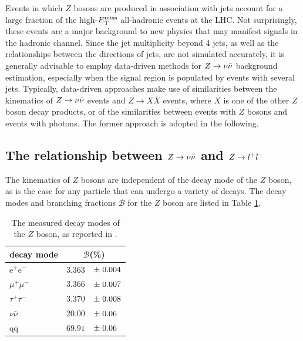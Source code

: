 Events in which $Z$ bosons are produced in association with jets account for a large fraction of the high-$E_{\text{T}}^{\rm miss}$ all-hadronic events at the LHC. Not surprisingly, these events are a major background to new physics that may manifest signals in the hadronic channel. Since the jet multiplicity beyond 4 jets, as well as the relationships between the directions of jets, are not simulated accurately, it is generally advisable to employ data-driven methods for $Z\rightarrow \nu\bar{\nu}$ background estimation, especially when the signal region is populated by events with several jets. Typically, data-driven approaches make use of similarities between the kinematics of $Z\rightarrow \nu\bar{\nu}$ events and $Z\rightarrow X\bar{X}$ events, where $X$ is one of the other $Z$ boson decay products, or of the similarities between events with $Z$ bosons and events with photons. The former approach is adopted in the following.


\subsection{The relationship between $Z\rightarrow \nu\bar{\nu}$ and $Z\rightarrow l^+l^-$}
The kinematics of $Z$ bosons are independent of the decay mode of the $Z$ boson, as is the case for any particle that can undergo a variety of decays. The decay modes and branching fractions $\mathcal{B}$ for the $Z$ boson are listed in Table \ref{tab:zdecay}. 

\begin{table}[h]
\vspace{0.5cm}
\centering
\caption{The measured decay modes of the $Z$ boson, as reported in \cite{Agashe:2014kda}.}
\begin{tabular}{l|rl}
\hline
decay mode & \multicolumn{2}{c}{$\mathcal{B}$(\%)}\\
\hline
e$^+$e$^-$ & $3.363$&\hspace{-3mm}$\pm \hspace{1mm}0.004$\\
$\mu^+\mu^-$ & $3.366$&\hspace{-3mm}$\pm \hspace{1mm}0.007$\\
$\tau^+\tau^-$ & $3.370$&\hspace{-3mm}$\pm \hspace{1mm}0.008$\\
$\nu\bar{\nu}$ & $20.00$&\hspace{-3mm}$\pm \hspace{1mm}0.06$\\
q$\bar{\text{q}}$ & $69.91$&\hspace{-3mm}$\pm \hspace{1mm}0.06$\\
\hline
\end{tabular}
\label{tab:zdecay}
\end{table}


